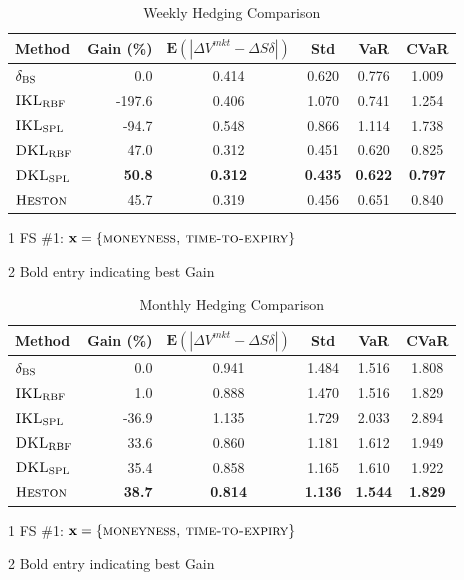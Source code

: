 \documentclass[letterpaper,12pt,titlepage,oneside,final]{book}
\numberwithin{equation}{section}
\theoremstyle{definition}
\newcommand{\vx}{\mathbf{x}}
\newcommand{\E}{\mathbf{E}}
\newcommand{\DS}{\Delta S}
\newcommand{\Heston}{\textsc{Heston}}
\newcommand{\DVmkt}{\Delta V^{mkt}}
\newcommand{\MeanAbs}{\E(|\DVmkt-\DS \delta |)}
\newcommand{\DKLs}{\bf\textsc{DKL}_{\text{SPL}}}
\newcommand{\DKLg}{\bf\textsc{DKL}_{\text{RBF}}}
\newcommand{\IKLs}{\bf\textsc{IKL}_{\text{SPL}}}
\newcommand{\IKLg}{\bf\textsc{IKL}_{\text{RBF}}}
\newcommand{\Del}{\delta_{\textsc{BS}}}
\begin{document}
\begin{table}[htp!]
\begin{center}
\begin{threeparttable}
\begin{tabular}{|l|r c c c c|}
\hline
Method & Gain (\%) & $\MeanAbs$ & Std& VaR & CVaR   \\ \hline
$\Del$ & 0.0 & 0.414 & 0.620 & 0.776 & 1.009 \\
$\IKLg$  & -197.6 & 0.406 & 1.070 & 0.741 & 1.254 \\
$\IKLs$  & -94.7 & 0.548 & 0.866 & 1.114 & 1.738 \\
$\DKLg$  & 47.0 & 0.312 & 0.451 & 0.620 & 0.825 \\
$\DKLs$  & \textbf{50.8} & \textbf{0.312} & \textbf{0.435} & \textbf{0.622} & \textbf{0.797} \\
$\Heston$ & 45.7 & 0.319 & 0.456 & 0.651 & 0.840 \\
\hline
\end{tabular}
\caption{Weekly Hedging Comparison}
\label{Weekly}
 \begin{tablenotes}
    \small
  \item[1] FS \#1: $\vx=\{\textsc{moneyness,~time-to-expiry}\}$
  \item[2] Bold entry indicating best Gain
  \end{tablenotes}
  \end{threeparttable}
\end{center}
\end{table}


\begin{table}[htp!]
\begin{center}
\begin{threeparttable}
\begin{tabular}{|l|r c c c c|}
\hline
Method & Gain (\%)& $\MeanAbs$ & Std& VaR & CVaR   \\ \hline
$\Del$ & 0.0 & 0.941 & 1.484 & 1.516 & 1.808 \\
$\IKLg$  & 1.0 & 0.888 & 1.470 & 1.516 & 1.829 \\
$\IKLs$  & -36.9 & 1.135 & 1.729 & 2.033 & 2.894 \\
$\DKLg$  & 33.6 & 0.860 & 1.181 & 1.612 & 1.949 \\
$\DKLs$  & {35.4} & {0.858} & {1.165} & {1.610} & {1.922} \\
$\Heston$ & \textbf{38.7} & \textbf{0.814} & \textbf{1.136} & \textbf{1.544} & \textbf{1.829} \\
\hline
\end{tabular}
\caption{Monthly Hedging Comparison}
\label{Monthly}
\begin{tablenotes}
    \small
  \item[1] FS \#1: $\vx=\{\textsc{moneyness,~time-to-expiry}\}$
  \item[2] Bold entry indicating best Gain
  \end{tablenotes}
  \end{threeparttable}
  \end{center}
\end{table}
\end{document}
